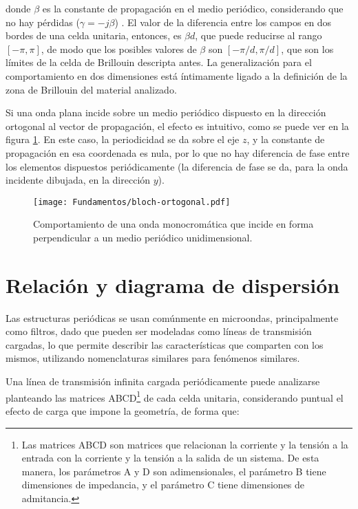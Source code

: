donde $\beta$ es la constante de propagación en el medio periódico, considerando que no hay pérdidas ($\gamma = -j\beta$) \cite{Capolino:TheoryPhenomenaMetamaterials}. El valor de la diferencia entre los campos en dos bordes de una celda unitaria, entonces, es $\beta d$, que puede reducirse al rango $[-\pi,\pi]$, de modo que los posibles valores de $\beta$ son $[-\pi/d,\pi/d]$, que son los límites de la celda de Brillouin descripta antes. La generalización para el comportamiento en dos dimensiones está íntimamente ligado a la definición de la zona de Brillouin del material analizado.

Si una onda plana incide sobre un medio periódico dispuesto en la dirección ortogonal al vector de propagación, el efecto es intuitivo, como se puede ver en la figura \ref{fig:bloch-ortogonal}. En este caso, la periodicidad se da sobre el eje $z$, y la constante de propagación en esa coordenada es nula, por lo que no hay diferencia de fase entre los elementos dispuestos periódicamente (la diferencia de fase se da, para la onda incidente dibujada, en la dirección $y$).

\begin{figure}[htp]
	\centering
	\texttt{[image: Fundamentos/bloch-ortogonal.pdf]}
	\caption{Comportamiento de una onda monocromática que incide en forma perpendicular a un medio periódico unidimensional.}
	\label{fig:bloch-ortogonal}
\end{figure}


\section{Relación y diagrama de dispersión}
\label{sec:diag-de-dispersion}

Las estructuras periódicas se usan comúnmente en microondas, principalmente como filtros, dado que pueden ser modeladas como líneas de transmisión cargadas, lo que permite describir las características que comparten con los mismos, utilizando nomenclaturas similares para fenómenos similares.

Una línea de transmisión infinita cargada periódicamente puede analizarse planteando las matrices ABCD\footnote{Las matrices ABCD son matrices que relacionan la corriente y la tensión a la entrada con la corriente y la tensión a la salida de un sistema. De esta manera, los parámetros A y D son adimensionales, el parámetro B tiene dimensiones de impedancia, y el parámetro C tiene dimensiones de admitancia.} de cada celda unitaria, considerando puntual el efecto de carga que impone la geometría, de forma que:

